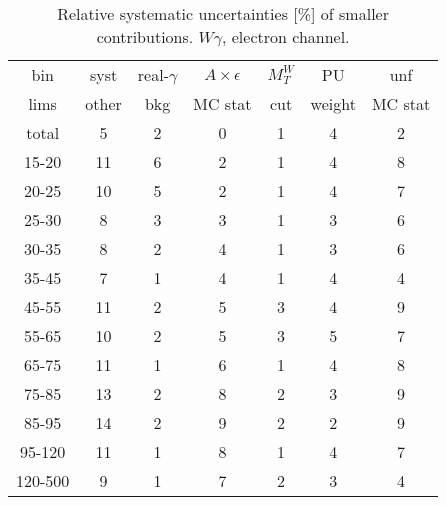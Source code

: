 \begin{table}[h]
  \scriptsize
  \begin{center}
  \caption{Relative systematic uncertainties [\%] of smaller contributions. $W\gamma$, electron channel.}
  \begin{tabular}{|c|c|c|c|c|c|c|}
    bin  & syst & real-$\gamma$ & $A\times\epsilon$ & $M_T^W$ & PU & unf\\
    lims  & other & bkg & MC stat & cut & weight & MC stat\\ \hline
    total  & 5 & 2 & 0 & 1 & 4 & 2 \\ \hline
    15-20 & 11 & 6 & 2 & 1 & 4 & 8 \\ \hline
    20-25 & 10 & 5 & 2 & 1 & 4 & 7 \\ \hline
    25-30 & 8 & 3 & 3 & 1 & 3 & 6 \\ \hline
    30-35 & 8 & 2 & 4 & 1 & 3 & 6 \\ \hline
    35-45 & 7 & 1 & 4 & 1 & 4 & 4 \\ \hline
    45-55 & 11 & 2 & 5 & 3 & 4 & 9 \\ \hline
    55-65 & 10 & 2 & 5 & 3 & 5 & 7 \\ \hline
    65-75 & 11 & 1 & 6 & 1 & 4 & 8 \\ \hline
    75-85 & 13 & 2 & 8 & 2 & 3 & 9 \\ \hline
    85-95 & 14 & 2 & 9 & 2 & 2 & 9 \\ \hline
    95-120 & 11 & 1 & 8 & 1 & 4 & 7 \\ \hline
    120-500 & 9 & 1 & 7 & 2 & 3 & 4 \\ \hline
  \end{tabular}
  \label{tab:systInPercentSmallSysts_ELECTRON_WGamma}
  \end{center}
\end{table}

